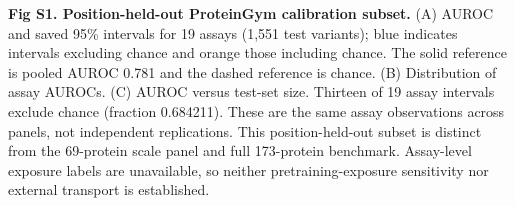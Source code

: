 \caption{{\bf Fig S1. Position-held-out ProteinGym calibration subset.} (A) AUROC and saved 95\% intervals for 19 assays (1,551 test variants); blue indicates intervals excluding chance and orange those including chance. The solid reference is pooled AUROC 0.781 and the dashed reference is chance. (B) Distribution of assay AUROCs. (C) AUROC versus test-set size. Thirteen of 19 assay intervals exclude chance (fraction 0.684211). These are the same assay observations across panels, not independent replications. This position-held-out subset is distinct from the 69-protein scale panel and full 173-protein benchmark. Assay-level exposure labels are unavailable, so neither pretraining-exposure sensitivity nor external transport is established.}
